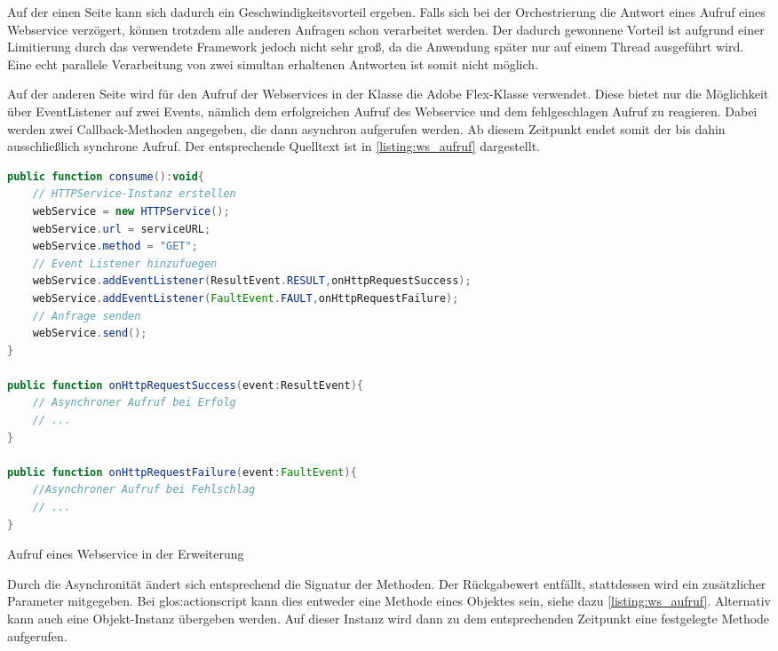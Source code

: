 \begin{onehalfspacing}
Auf der einen Seite kann sich dadurch ein Geschwindigkeitsvorteil ergeben. Falls sich bei der Orchestrierung die Antwort eines Aufruf eines Webservice verzögert, können trotzdem alle anderen Anfragen schon verarbeitet werden. Der dadurch gewonnene Vorteil ist aufgrund  einer Limitierung durch das verwendete Framework jedoch nicht sehr groß, da die Anwendung später nur auf einem Thread ausgeführt wird. Eine echt parallele Verarbeitung von zwei simultan erhaltenen Antworten ist somit nicht möglich.

Auf der anderen Seite wird für den Aufruf der Webservices in der Klasse  die Adobe Flex-Klasse  verwendet. Diese bietet nur die Möglichkeit über EventListener auf zwei Events, nämlich dem erfolgreichen Aufruf des Webservice und dem fehlgeschlagen Aufruf zu reagieren. Dabei werden zwei Callback-Methoden angegeben, die dann asynchron aufgerufen werden. Ab diesem Zeitpunkt endet somit der bis dahin ausschließlich synchrone Aufruf. Der entsprechende Quelltext ist in \vref{listing:ws_aufruf} dargestellt.

\begin{programm}[h]
\begin{lstlisting}[language=ActionScript]
public function consume():void{
	// HTTPService-Instanz erstellen
	webService = new HTTPService();
	webService.url = serviceURL;       
	webService.method = "GET";
	// Event Listener hinzufuegen
	webService.addEventListener(ResultEvent.RESULT,onHttpRequestSuccess);
	webService.addEventListener(FaultEvent.FAULT,onHttpRequestFailure);
	// Anfrage senden
	webService.send();
}
		
public function onHttpRequestSuccess(event:ResultEvent){
	// Asynchroner Aufruf bei Erfolg
	// ...
}
		
public function onHttpRequestFailure(event:FaultEvent){
	//Asynchroner Aufruf bei Fehlschlag
	// ...
}
\end{lstlisting}
\caption{Aufruf eines Webservice in der Erweiterung\label{listing:ws_aufruf}}
\end{programm}

Durch die Asynchronität ändert sich entsprechend die Signatur der Methoden. Der Rückgabewert entfällt, stattdessen wird ein zusätzlicher Parameter mitgegeben. Bei \gls{glos:actionscript} kann dies entweder eine Methode eines Objektes sein, siehe dazu \vref{listing:ws_aufruf}. Alternativ kann auch eine Objekt-Instanz übergeben werden. Auf dieser Instanz wird dann zu dem entsprechenden Zeitpunkt eine festgelegte Methode aufgerufen.


\end{onehalfspacing}
